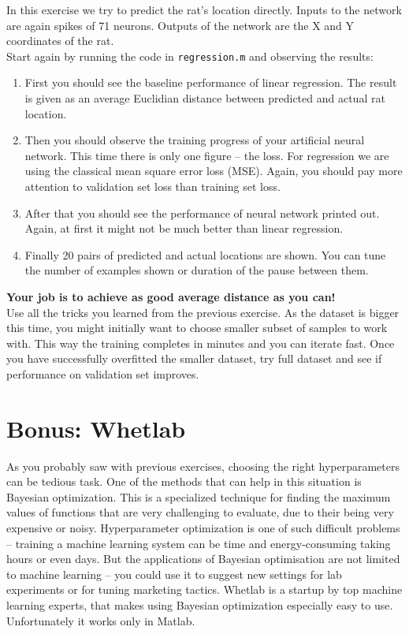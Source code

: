 \documentclass[a4paper,11pt]{article}
\begin{document}
In this exercise we try to predict the rat's location directly. Inputs to the network are again spikes of 71 neurons. Outputs of the network are the X and Y coordinates of the rat.\\

Start again by running the code in \texttt{regression.m} and observing the results:

\begin{enumerate}
	\item First you should see the baseline performance of linear regression. The result is given as an average Euclidian distance between predicted and actual rat location.
	\item Then you should observe the training progress of your artificial neural network. This time there is only one figure -- the loss. For regression we are using the classical mean square error loss (MSE). Again, you should pay more attention to validation set loss than training set loss.
	\item After that you should see the performance of neural network printed out. Again, at first it might not be much better than linear regression.
	\item Finally 20 pairs of predicted and actual locations are shown. You can tune the number of examples shown or duration of the pause between them.
\end{enumerate}

\textbf{Your job is to achieve as good average distance as you can!}\\

Use all the tricks you learned from the previous exercise. As the dataset is bigger this time, you might initially want to choose smaller subset of samples to work with. This way the training completes in minutes and you can iterate fast. Once you have successfully overfitted the smaller dataset, try full dataset and see if performance on validation set improves.

%
%
\section*{Bonus: Whetlab}

As you probably saw with previous exercises, choosing the right hyperparameters can be tedious task. One of the methods that can help in this situation is Bayesian optimization. This is a specialized technique for finding the maximum values of functions that are very challenging to evaluate, due to their being very expensive or noisy. Hyperparameter optimization is one of such difficult problems -- training a machine learning system can be time and energy-consuming taking hours or even days. But the applications of Bayesian optimisation are not limited to machine learning -- you could use it to suggest new settings for lab experiments or for tuning marketing tactics. Whetlab is a startup by top machine learning experts, that makes using Bayesian optimization especially easy to use. Unfortunately it works only in Matlab.\\
\end{document}

